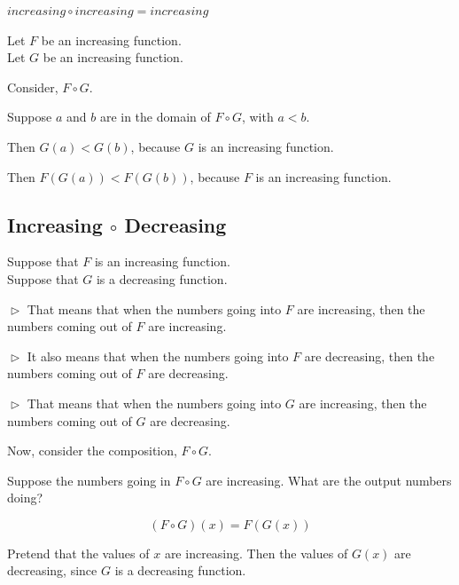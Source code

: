 \documentclass{ximera}
\begin{document}
\begin{fact}
$increasing \circ increasing = increasing$


Let $F$ be an increasing function. \\
Let $G$ be an increasing function. 


Consider, $F \circ G$.

Suppose $a$ and $b$ are in the domain of $F \circ G$, with $a < b$. 

Then $G(a) < G(b)$, because $G$ is an increasing function. 

Then $F(G(a)) < F(G(b))$, because $F$ is an increasing function.


\end{fact}





















\subsection*{Increasing $\circ$ Decreasing}


Suppose that $F$ is an increasing function. \\
Suppose that $G$ is a decreasing function. 


$\vartriangleright$ That means that when the numbers going into $F$ are increasing, then the numbers coming out of $F$ are increasing. 

$\vartriangleright$ It also means that when the numbers going into $F$ are decreasing, then the numbers coming out of $F$ are decreasing. 



$\vartriangleright$ That means that when the numbers going into $G$ are increasing, then the numbers coming out of $G$ are decreasing. 



Now, consider the composition, $F \circ G$. 


Suppose the numbers going in $F \circ G$ are increasing.  What are the output numbers doing? 




\[ (F \circ G)(x) = F(G(x)) \]


Pretend that the values of $x$ are increasing. Then the values of $G(x)$ are decreasing, since $G$ is a decreasing function.
\end{document}
